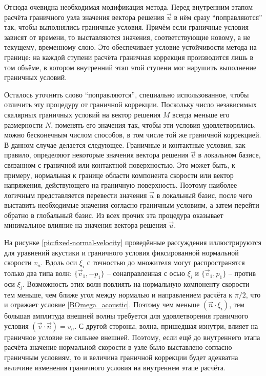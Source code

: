 Отсюда очевидна необходимая модификация метода. Перед внутренним этапом расчёта 
граничного узла значения вектора решения $\vec{u}$ в нём сразу ``поправляются'' так, чтобы выполнялись 
граничные условия. Причём если граничные условия зависят от времени, то выставляются 
значения, соответствующие новому, а не текущему, временному слою. Это обеспечивает условие 
устойчивости метода на границе: на каждой ступени расчёта граничная коррекция производится лишь в том 
объёме, в котором внутренний этап этой ступени мог нарушить выполнение граничных условий.

Осталось уточнить слово ``поправляются'', специально использованное, 
чтобы отличить эту процедуру от граничной коррекции. 
Поскольку число независимых скалярных граничных условий на вектор решения $M$
всегда меньше его размерности $N$, поменять его значения так, чтобы эти условия  
удовлетворялись, можно бесконечным числом способов, 
в том числе той же граничной коррекцией. В данном случае делается следующее. 
Граничные и контактные условия, как правило, определяют некоторые значения 
вектора решения $\vec{u}$ в локальном базисе, связанном с граничной или контактной поверхностью. 
Это может быть, к примеру, нормальная к границе области компонента скорости или 
вектор напряжения, действующего на граничную поверхность. Поэтому наиболее логичным 
представляется перевести значения $\vec{u}$ в локальный базис, после чего 
выставить необходимые значения согласно граничным условиям, а затем перейти 
обратно в глобальный базис. Из всех прочих эта процедура 
оказывает минимальное влияние на значения вектора решения $\vec{u}$. 

На рисунке \ref{pic:fixed-normal-velocity} проведённые рассуждения иллюстрируются для 
уравнений акустики и граничного условия фиксированной нормальной скорости $v_n$. 
Вдоль оси $\xi_i$ с точностью до множителя могут распространятся только два типа волн:
$\{ \vec{v}_1, - p_1 \}$ -- сонаправленная с осью $\xi_i$ и 
$\{ \vec{v}_1, p_1 \}$ -- против оси $\xi_i$. 
Возможность этих волн повлиять на нормальную компоненту скорости тем меньше, чем 
ближе угол между нормалью и направлением расчёта к $\pi/2$, что и отражает условие 
\ref{BOmega_acoustic}. Поэтому чем меньше $(\vec{n} \cdot \xi_i)$, тем большая амплитуда 
внешней волны требуется для удовлетворения граничного условия $(\vec{v} \cdot \vec{n}) = v_n$. 
С другой стороны, волна, пришедшая изнутри, влияет на граничное условие не сильнее внешней. 
Поэтому, если ещё до внутреннего этапа расчёта значение нормальной скорости в узле 
было выставлено согласно граничным условиям, то и величина граничной коррекции будет 
адекватна величине изменения граничного условия на внутреннем этапе расчёта.

